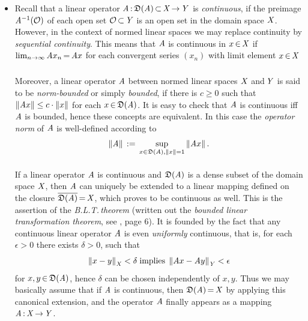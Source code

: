 \documentclass[11pt,twoside]{article}
\begin{document}
\begin{itemize}[leftmargin=12pt,itemsep=3pt]
\item[1.] %
Recall that a linear operator
$\mathit{A} {\,:\,} \mathfrak{D}(\mathit{A}) {\,\subset\,} \mathit{X} {\,\to\,} \mathit{Y}$
is \textit{continuous},
if the preimage $\mathit{A}^{-1}(\mathcal{O})$ of each open set $\mathcal{O} {\,\subset\,} \mathit{Y}$
is an open set in the domain space $\mathit{X}$.
However,
in the context of normed linear spaces
we may replace continuity by \textit{sequential continuity}.
This means that $\mathit{A}$ is continuous in $x {\,\in\,} \mathit{X}$
if
$\lim_{n \to \infty} \mathit{A} x_n  {\,=\,} \mathit{A} x$
for each convergent series $(x_n)$ with limit element $x {\,\in\,} \mathit{X}$

\subparagraph{} %
Moreover,
a linear operator $\mathit{A}$ between normed linear spaces $\mathit{X}$
and\,$\mathit{Y}$ is said to be \textit{norm-bounded} or simply \textit{bounded},
if there is $c \geq 0$
such that $\left\lVert \mathit{A} x \right\rVert \leq c \cdot \left\lVert x \right\rVert$
for each $x {\,\in\,} \mathfrak{D}(\mathit{A})$.
It is easy to check that $\mathit{A}$ is continuous iff $\mathit{A}$ is bounded,
hence these concepts are equivalent.
In this case the \textit{operator norm} of $\mathit{A}$ is well-defined according to
\begin{equation}\label{OPERATOR_NORM}
\left\lVert \mathit{A} \right\rVert \,:=\, \sup_{x \in \mathfrak{D}(\mathit{A}), \left\lVert x \right\rVert=1} \left\lVert \mathit{A} x \right\rVert.
\end{equation}

\paragraph{} %
If a linear operator $\mathit{A}$ is continuous and 
$\mathfrak{D}(\mathit{A})$ is a dense subset of the domain space $\mathit{X}$,
then $\mathit{A}$ can uniquely be extended to a linear mapping
defined on the closure $\overline{\mathfrak{D}(\mathit{A})} {\,=\,} \mathit{X}$,
which proves to be continuous as well.
This is the assertion of the \textit{B.L.T.\,theorem}
(written out the \textit{bounded linear transformation theorem},
see \cite{RS1}, page 6).
It is founded by the fact that
any continuous linear operator $\mathit{A}$ is even \textit{uniformly} continuous,
that is,
for each $\epsilon > 0$ there exists $\delta > 0$,
such that
\[
\left\lVert x-y \right\rVert_{\mathit{X}} < \delta
\; \mbox{implies} \;
\left\lVert \mathit{A} x - \mathit{A} y \right\rVert_{\mathit{Y}} < \epsilon
\]
for $x,y {\,\in\,} \mathfrak{D}(\mathit{A})$,
hence $\delta$ can be chosen independently of $x,y$.
Thus we may basically assume
that if $\mathit{A}$ is continuous,
then $\mathfrak{D}(\mathit{A}) {\,=\,} \mathit{X}$ by applying this canonical extension,
and the operator $\mathit{A}$ finally appears as a mapping
$\mathit{A} {\,:\,} \mathit{X} {\,\to\,} \mathit{Y}$.


\end{itemize}
\end{document}
